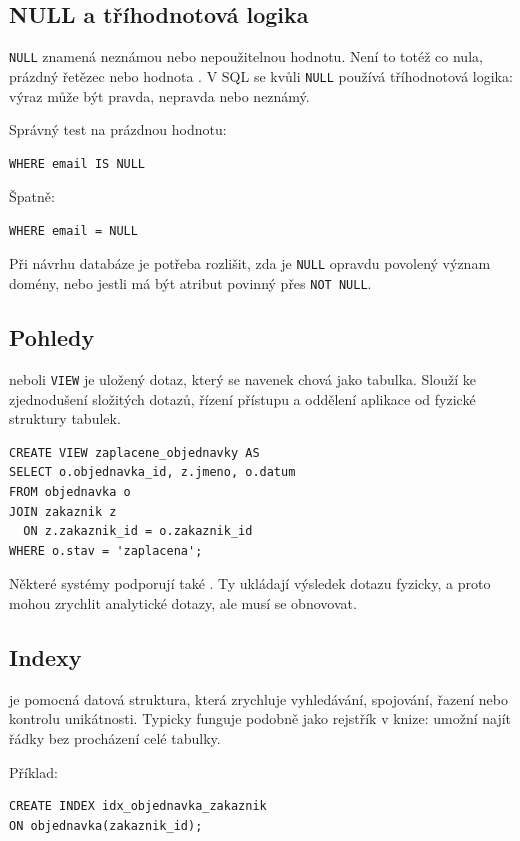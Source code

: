 \subsection{NULL a tříhodnotová logika}
\texttt{NULL} znamená neznámou nebo nepoužitelnou hodnotu. Není to totéž co nula, prázdný řetězec
nebo hodnota . V SQL se kvůli \texttt{NULL} používá tříhodnotová logika: výraz může být pravda,
nepravda nebo neznámý.

Správný test na prázdnou hodnotu:
{\small
\begin{verbatim}
WHERE email IS NULL
\end{verbatim}
}

Špatně:
{\small
\begin{verbatim}
WHERE email = NULL
\end{verbatim}
}

Při návrhu databáze je potřeba rozlišit, zda je \texttt{NULL} opravdu povolený význam domény, nebo
jestli má být atribut povinný přes \texttt{NOT NULL}.

\subsection{Pohledy}
 neboli \texttt{VIEW} je uložený dotaz, který se navenek chová jako tabulka. Slouží ke
zjednodušení složitých dotazů, řízení přístupu a oddělení aplikace od fyzické struktury tabulek.

{\small
\begin{verbatim}
CREATE VIEW zaplacene_objednavky AS
SELECT o.objednavka_id, z.jmeno, o.datum
FROM objednavka o
JOIN zakaznik z
  ON z.zakaznik_id = o.zakaznik_id
WHERE o.stav = 'zaplacena';
\end{verbatim}
}

Některé systémy podporují také . Ty ukládají výsledek dotazu fyzicky,
a proto mohou zrychlit analytické dotazy, ale musí se obnovovat.

\subsection{Indexy}
 je pomocná datová struktura, která zrychluje vyhledávání, spojování, řazení nebo kontrolu
unikátnosti. Typicky funguje podobně jako rejstřík v knize: umožní najít řádky bez procházení celé
tabulky.

Příklad:
{\small
\begin{verbatim}
CREATE INDEX idx_objednavka_zakaznik
ON objednavka(zakaznik_id);
\end{verbatim}
}

